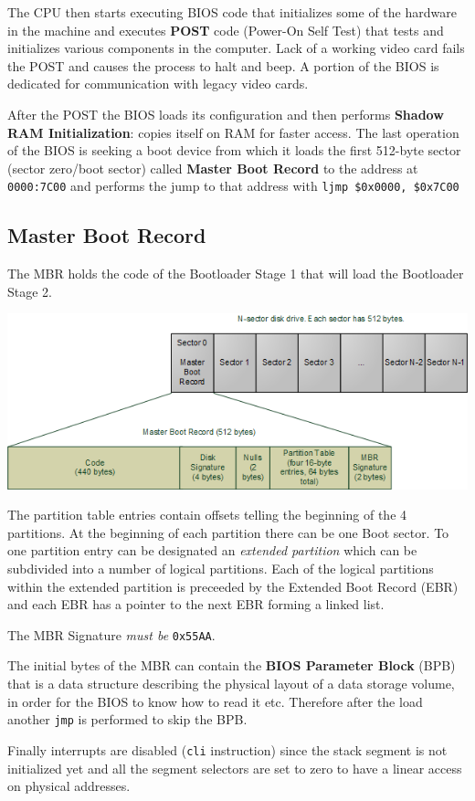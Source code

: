 \documentclass[twoside]{article}
\begin{document}
The CPU then starts executing BIOS code that initializes some of the hardware in the machine and executes \textbf{POST} code (Power-On Self Test) that tests and initializes various components in the computer. Lack of a working video card fails the POST and causes the process to halt and beep. A portion of the BIOS is dedicated for communication with legacy video cards.

After the POST the BIOS loads its configuration and then performs \textbf{Shadow RAM Initialization}: copies itself on RAM for faster access.
The last operation of the BIOS is seeking a boot device from which it loads the first 512-byte sector (sector zero/boot sector) called \textbf{Master Boot Record} to the address at \texttt{0000:7C00} and performs the jump to that address with \texttt{ljmp \$0x0000, \$0x7C00}

\subsection{Master Boot Record}
The MBR holds the code of the Bootloader Stage 1 that will load the Bootloader Stage 2.
\begin{center}
\includegraphics[width= 0.7 \textwidth]{masterBootRecord.png}
\end{center}
The partition table entries contain offsets telling the beginning of the 4 partitions. At the beginning of each partition there can be one Boot sector. To one partition entry can be designated an \textit{extended partition} which can be subdivided into a number of logical partitions. Each of the logical partitions within the extended partition is preceeded by the Extended Boot Record (EBR) and each EBR has a pointer to the next EBR forming a linked list.

The MBR Signature \textit{must be} \texttt{0x55AA}.

The initial bytes of the MBR can contain the \textbf{BIOS Parameter Block} (BPB) that is a data structure describing the physical layout of a data storage volume, in order for the BIOS to know how to read it etc. Therefore after the load another \texttt{jmp} is performed to skip the BPB.

Finally interrupts are disabled (\texttt{cli} instruction) since the stack segment is not initialized yet and all the segment selectors are set to zero to have a linear access on physical addresses.



\end{document}
